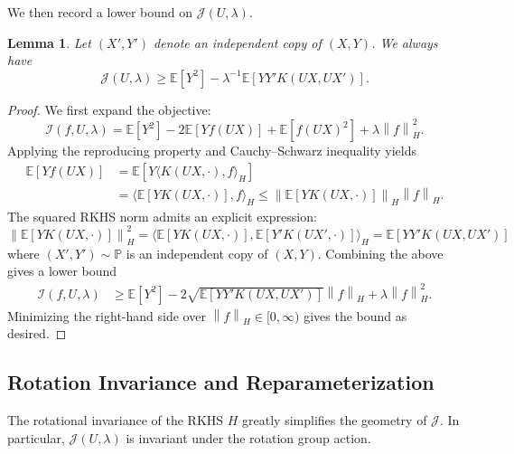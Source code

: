 \documentclass[sn-mathphys-num]{sn-jnl}%
\numberwithin{equation}{section}
\newcommand{\E}{\mathbb{E}}
\newcommand{\kernel}{K}
\newcommand{\norm}[1]{\left\|{#1}\right\|} %
\renewcommand{\P}{\mathbb{P}}
\newtheorem{lemma}{Lemma}
\theoremstyle{thmstyleone}%
\theoremstyle{thmstyletwo}%
\theoremstyle{thmstylethree}%
\begin{document}
We then record a lower bound on $\mathcal{J}(U,\lambda)$.
\vspace{.5em}
\begin{lemma}
\label{lemma:lower-bound-U}
Let $(X', Y')$ denote an independent copy of $(X, Y)$. We always have 
\begin{equation}
	\mathcal{J}(U, \lambda) \ge \E[Y^2 ] - \lambda^{-1} \E[YY' K(UX, UX')].
\end{equation} 
\end{lemma} 
\begin{proof} 
We first expand the objective: 
\begin{equation*}
	\mathcal{I}(f, U, \lambda) = \E[Y^2] - 2\E[Y f(U X)] + \E[f(U X)^2] + \lambda \norm{f}_H^2.
\end{equation*}
Applying the reproducing property and Cauchy–Schwarz inequality yields
\begin{equation*}
\begin{split}
	\E[Y f(U X)] &= \E[Y \langle \kernel(U X, \cdot), f \rangle_H] \\
		&= \langle \E[Y  \kernel(U X, \cdot)], f \rangle_H
		\le \norm{\E[Y  \kernel(U X, \cdot)]}_H \norm{f}_H.
\end{split}
\end{equation*}
The squared RKHS norm admits an explicit expression: 
\begin{equation*}
	\norm{\E[Y  \kernel(U X, \cdot)]}_H^2 
		= \langle \E[Y  \kernel(U X, \cdot)], \E[Y'  \kernel(U X', \cdot)]\rangle_H
		= \E[YY'\kernel(U X, U X')]
\end{equation*} 
where $(X', Y') \sim \P$ is an independent copy of $(X, Y)$. 
Combining the above gives a lower bound 
\begin{equation*}
\begin{split} 
	\mathcal{I}(f, U, \lambda) %
		&\ge \E[Y^2] - 2 \sqrt{\E[YY' \kernel(U X, U X')]} \norm{f}_H + \lambda \norm{f}_H^2.
\end{split} 
\end{equation*} 
Minimizing the right-hand side over $\norm{f}_H \in [0, \infty)$ gives the bound as desired. 
\end{proof} 


\subsection{Rotation Invariance and Reparameterization}
\label{sec:rotation-invariance-and-reparameterization}
\indent\indent
The rotational invariance of the RKHS $H$ greatly simplifies the geometry of $\mathcal{J}$. In particular, 
$\mathcal{J}(U, \lambda)$ is invariant under the rotation group action.
\end{document}
